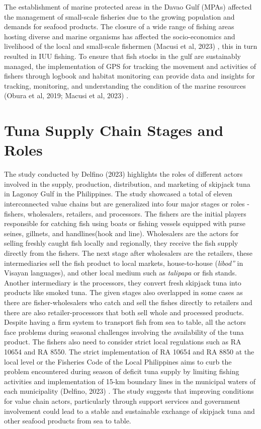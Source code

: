 The establishment of marine protected areas in the Davao Gulf (MPAs) affected the management of small-scale fisheries due to the growing population and demands for seafood products. The closure of a wide range of fishing areas hosting diverse and marine organisms has affected the socio-economics and livelihood of the local and small-scale fishermen (Macusi et al, 2023) \nocite{rrl-TFSC4}, this in turn resulted in IUU fishing.  To ensure that fish stocks in the gulf are sustainably managed, the implementation of GPS for tracking the movement and activities of fishers through logbook and habitat monitoring can provide data and insights for tracking, monitoring, and understanding the condition of the marine resources (Obura et al, 2019; Macusi et al, 2023) \nocite{rrl-TFSC5}.

\section{Tuna Supply Chain Stages and Roles} 

The study conducted by Delfino (2023) \nocite{rrl-TSCSR1} highlights the roles of different actors involved in the supply, production, distribution, and marketing of skipjack tuna in Lagonoy Gulf in the Philippines. The study showcased a total of eleven interconnected value chains but are generalized into four major stages or roles - fishers, wholesalers, retailers, and processors. The fishers are the initial players responsible for catching fish using boats or fishing vessels equipped with purse seines, gillnets, and handlines(hook and line). Wholesalers are the actors for selling freshly caught fish locally and regionally, they receive the fish supply directly from the fishers. The next stage after wholesalers are the retailers, these intermediaries sell the fish product to local markets, house-to-house (\textit{libod”} in Visayan languages), and other local medium such as \textit{talipapa} or fish stands. Another intermediary is the processors, they convert fresh skipjack tuna into products like smoked tuna. The given stages also overlapped in some cases as there are fisher-wholesalers who catch and sell the fishes directly to retailers and there are also retailer-processors that both sell whole and processed products. Despite having a firm system to transport fish from sea to table, all the actors face problems during seasonal challenges involving the availability of the tuna product. The fishers also need to consider strict local regulations such as RA 10654 and RA 8550. The strict implementation of RA 10654 and RA 8850 at the local level or the Fisheries Code of the Local Philippines aims to curb the problem encountered during season of deficit tuna supply by limiting fishing activities and implementation of 15-km boundary lines in the municipal waters of each municipality (Delfino, 2023) \nocite{rrl-TSCSR1}. The study suggests that improving conditions for value chain actors, particularly through support services and government involvement could lead to a stable and sustainable exchange of skipjack tuna and other seafood products from sea to table.

